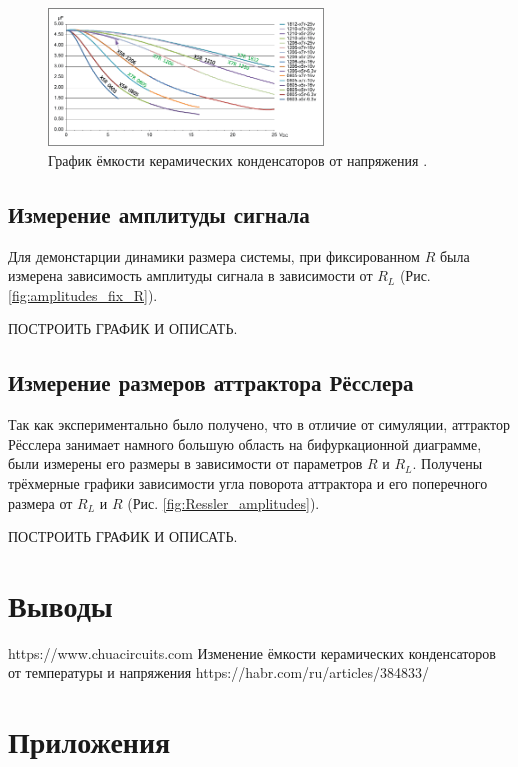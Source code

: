 \documentclass[12pt]{article}
\begin{document}
\begin{figure}[H]
	\centering
	\includegraphics[width=0.65\textwidth]{decrease_graph.png}
	\caption{График ёмкости керамических конденсаторов от напряжения \cite{Habr_C}.}
	\label{fig:C_decrease}
\end{figure}

\subsection*{Измерение амплитуды сигнала }
Для демонстарции динамики размера системы, при фиксированном $R$ была измерена зависимость 
амплитуды сигнала в зависимости от $R_L$ (Рис. \ref{fig:amplitudes_fix_R}).  

ПОСТРОИТЬ ГРАФИК И ОПИСАТЬ. 

\subsection*{Измерение размеров аттрактора Рёсслера}
Так как экспериментально было получено, что в отличие от симуляции, аттрактор 
Рёсслера занимает намного большую область на бифуркационной диаграмме, были измерены 
его размеры в зависимости от параметров $R$ и $R_L$. Получены трёхмерные графики зависимости угла поворота аттрактора и 
его поперечного размера от $R_L$ и $R$ (Рис. \ref{fig:Ressler_amplitudes}).

ПОСТРОИТЬ ГРАФИК И ОПИСАТЬ. 


\section*{Выводы}

\begin{thebibliography}{9}
	https://www.chuacircuits.com
	Изменение ёмкости керамических конденсаторов от температуры и напряжения https://habr.com/ru/articles/384833/
\end{thebibliography}

\section*{Приложения}
\end{document}
